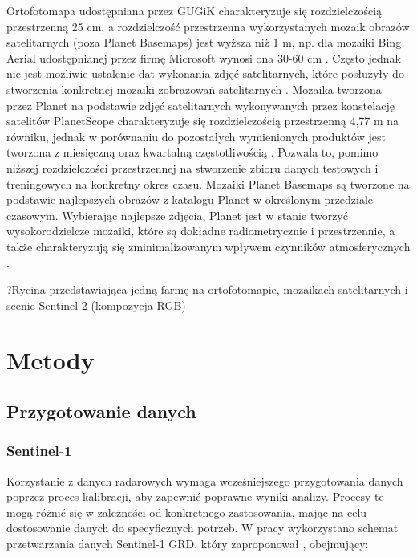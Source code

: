 \documentclass{amuthesis}
\begin{document}
Ortofotomapa udostępniana przez GUGiK charakteryzuje się rozdzielczością
przestrzenną 25 cm, a rozdzielczość przestrzenna wykorzystanych mozaik
obrazów satelitarnych (poza Planet Basemaps) jest wyższa niż 1 m, np.
dla mozaiki Bing Aerial udostępnianej przez firmę Microsoft wynosi ona
30-60 cm \autocite{ortofotomapa,bing_aerial}. Często jednak nie jest
możliwie ustalenie dat wykonania zdjęć satelitarnych, które posłużyły do
stworzenia konkretnej mozaiki zobrazowań satelitarnych
\autocite{lesiv_2018_sat_imagery_mosaics}. Mozaika tworzona przez Planet
na podstawie zdjęć satelitarnych wykonywanych przez konstelację
satelitów PlanetScope charakteryzuje się rozdzielczością przestrzenną
4,77 m na równiku, jednak w porównaniu do pozostałych wymienionych
produktów jest tworzona z miesięczną oraz kwartalną częstotliwością
\autocite{planet_2019_basemaps}. Pozwala to, pomimo niższej
rozdzielczości przestrzennej na stworzenie zbioru danych testowych i
treningowych na konkretny okres czasu. Mozaiki Planet Basemaps są
tworzone na podstawie najlepszych obrazów z katalogu Planet w określonym
przedziale czasowym. Wybierając najlepsze zdjęcia, Planet jest w stanie
tworzyć wysokorodzielcze mozaiki, które są dokładne radiometrycznie i
przestrzennie, a także charakteryzują się zminimalizowanym wpływem
czynników atmosferycznych \autocite{planet_2019_basemaps}.

?Rycina przedstawiająca jedną farmę na ortofotomapie, mozaikach
satelitarnych i scenie Sentinel-2 (kompozycja RGB)


\hypertarget{sec-metody}{%
\chapter{Metody}\label{sec-metody}}

\hypertarget{sec-processing}{%
\section{Przygotowanie danych}\label{sec-processing}}

\hypertarget{sec-processing-s1}{%
\subsection{Sentinel-1}\label{sec-processing-s1}}

Korzystanie z danych radarowych wymaga wcześniejszego przygotowania
danych poprzez proces kalibracji, aby zapewnić poprawne wyniki analizy.
Procesy te mogą różnić się w zależności od konkretnego zastosowania,
mając na celu dostosowanie danych do specyficznych potrzeb. W pracy
wykorzystano schemat przetwarzania danych Sentinel-1 GRD, który
zaproponował \textcite{filipponi_2019_s1_workflow}, obejmujący:
\end{document}
